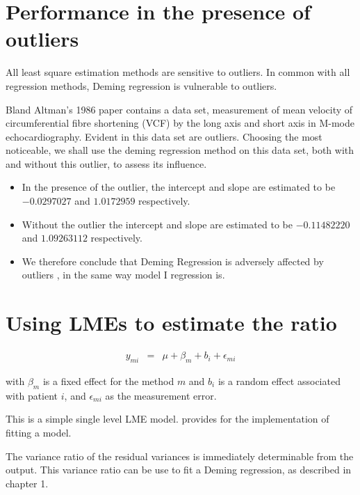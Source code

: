 \documentclass[12pt, a4paper]{report}
\theoremstyle{plain}
\theoremstyle{definition}
\theoremstyle{remark}
\begin{document}
\section{Performance in the presence of outliers}
All least square estimation methods are sensitive to outliers.
In common with all regression methods, Deming regression is vulnerable to outliers. 

Bland Altman's 1986 paper contains a data set, measurement of mean velocity of circumferential fibre shortening (VCF) by the long axis and short axis in M-mode echocardiography. Evident in this data set are outliers. Choosing the most noticeable, we shall use the deming regression method on this data set, both with and
without this outlier, to assess its influence.
\begin{itemize}
	\item In the presence of the outlier, the intercept and slope are estimated to be $-0.0297027$ and $1.0172959$ respectively.
	\item Without the outlier the intercept and slope are estimated to be
	$-0.11482220$ and  $1.09263112$ respectively.
	\item We therefore conclude that Deming Regression is adversely affected
	by outliers , in the same way model I regression is.
\end{itemize}





\section{Using LMEs to estimate the ratio}

\begin{eqnarray*}
	y_{mi} &=& \mu + \beta_{m} + b_{i} + \epsilon_{mi}
\end{eqnarray*}

with $\beta_{m}$ is a fixed effect for the method $m$ and $b_{i}$
is a random effect associated with patient $i$, and
$\epsilon_{mi}$ as the measurement error.

This is a simple single level LME model. \citet{pb} provides for
the implementation of fitting a model.

The variance ratio of the residual variances is immediately
determinable from the output. This variance ratio can be use to
fit a Deming regression, as described in chapter 1.


\end{document}
